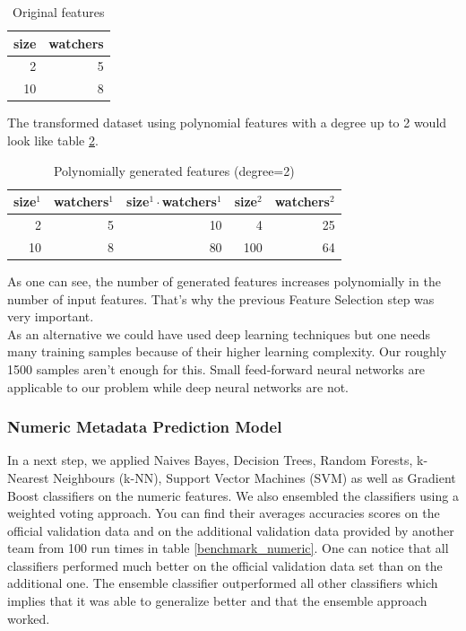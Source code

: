 \documentclass[%
a4paper,
DIV12,
2.5headlines,
bigheadings,
titlepage,
openbib,
]{scrartcl}
\begin{document}
\begin{table}[h]
\label{example-feature-engineering-basic}
\centering
\caption{Original features}
\begin{tabular}{|r|r|}
\hline
size & watchers \\ \hline
2    & 5        \\ \hline
10   & 8        \\ \hline
\end{tabular}
\end{table}

The transformed dataset using polynomial features with a degree up to 2 would look like table \ref{example-feature-engineering-transformed}.

\begin{table}[h]
\label{example-feature-engineering-transformed}
\centering
\caption{Polynomially generated features (degree=2)}
\begin{tabular}{|r|r|r|r|r|}
\hline
size$^1$ & watchers$^1$ & size$^1\cdot$watchers$^1$ & size$^2$ & watchers$^2$ \\ \hline
2 & 5 & 10 & 4 & 25 \\ \hline
10 & 8 & 80 & 100 & 64 \\ \hline
\end{tabular}
\end{table}
As one can see, the number of generated features increases polynomially in the number of input features.
That's why the previous Feature Selection step was very important.\\
As an alternative we could have used deep learning techniques but one needs many training samples because of their higher learning complexity.
Our roughly 1500 samples aren't enough for this.
Small feed-forward neural networks are applicable to our problem while deep neural networks are not.

\subsubsection{Numeric Metadata Prediction
Model}\label{numeric-metadata-prediction-model}
In a next step, we applied Naives Bayes, Decision Trees, Random Forests, k-Nearest Neighbours (k-NN), Support Vector Machines (SVM) as well as Gradient Boost classifiers on the numeric features.
We also ensembled the classifiers using a weighted voting approach.
You can find their averages accuracies scores on the official validation data and on the additional validation data provided by another team from 100 run times in table \ref{benchmark_numeric}.
One can notice that all classifiers performed much better on the official validation data set than on the additional one.
The ensemble classifier outperformed all other classifiers which implies that it was able to generalize better and that the ensemble approach worked.
\end{document}
